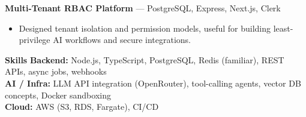 \documentclass[10pt,a4paper]{article}
\begin{document}
\textbf{Multi-Tenant RBAC Platform} — PostgreSQL, Express, Next.js, Clerk\\
\begin{itemize}
  \item Designed tenant isolation and permission models, useful for building least-privilege AI workflows and secure integrations.
\end{itemize}

\vspace{6pt}
{\large\bfseries Skills}
\vspace{2pt}
\textbf{Backend:} Node.js, TypeScript, PostgreSQL, Redis (familiar), REST APIs, async jobs, webhooks\\
\textbf{AI / Infra:} LLM API integration (OpenRouter), tool-calling agents, vector DB concepts, Docker sandboxing\\
\textbf{Cloud:} AWS (S3, RDS, Fargate), CI/CD
\end{document}
